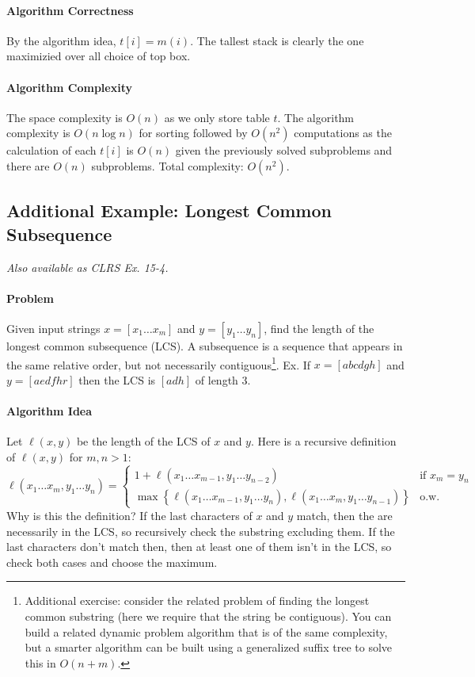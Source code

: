 \documentclass[11pt]{article}
\theoremstyle{plain}
\theoremstyle{definition}
\numberwithin{equation}{section}
\numberwithin{figure}{section}
\begin{document}
\paragraph{Algorithm Correctness} By the algorithm idea, $t[i] = m(i)$. The tallest stack is clearly the one maximizied over all choice of top box.

\paragraph{Algorithm Complexity} The space complexity is $O(n)$ as we only store table $t$. The algorithm complexity is $O(n \log n)$ for sorting followed by $O(n^2)$ computations as the calculation of each $t[i]$ is $O(n)$ given the previously solved subproblems and there are $O(n)$ subproblems. Total complexity: $O(n^2)$.

\subsection{Additional Example: Longest Common Subsequence}

\noindent \textit{Also available as CLRS Ex. 15-4.}

\paragraph{Problem} Given input strings $x = [x_1 \ldots x_m]$ and $y = [y_1 \ldots y_n]$, find the length of the longest common subsequence (LCS). A subsequence is a sequence that appears in the same relative order, but not necessarily contiguous\footnote{Additional exercise: consider the related problem of finding the longest common substring (here we require that the string be contiguous). You can build a related dynamic problem algorithm that is of the same complexity, but a smarter algorithm can be built using a generalized suffix tree to solve this in $O(n + m)$.}. Ex. If $x = [abcdgh]$ and $y = [aedfhr]$ then the LCS is $[adh]$ of length 3. 

\paragraph{Algorithm Idea} Let $\ell(x, y)$ be the length of the LCS of $x$ and $y$. Here is a recursive definition of $\ell(x,y)$ for $m, n > 1$:
\begin{equation}
\ell(x_1\ldots x_m,y_1 \ldots y_n) = \begin{cases} 1 + \ell(x_1 \ldots x_{m-1}, y_1 \ldots y_{n-2}) & \text{if } x_m = y_n \\ \max \left\{ \ell(x_1 \ldots x_{m-1}, y_1 \ldots y_n), \ell(x_1 \ldots x_m, y_1 \ldots y_{n-1})\right \} & \text{o.w.}\end{cases} \label{eq:rec2}
\end{equation}
Why is this the definition? If the last characters of $x$ and $y$ match, then the are necessarily in the LCS, so recursively check the substring excluding them. If the last characters don't match then, then at least one of them isn't in the LCS, so check both cases and choose the maximum.
\end{document}

